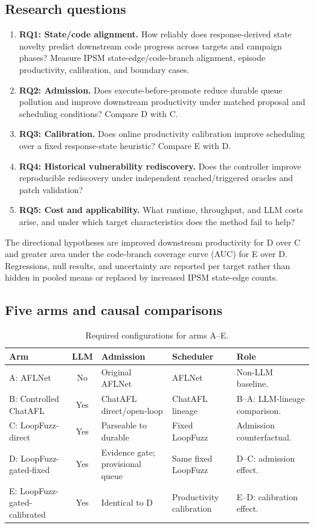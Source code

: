 \documentclass[final,5p,times,number]{elsarticle}
\begin{document}
\subsection{Research questions}
\begin{enumerate}
\item \textbf{RQ1: State/code alignment.} How reliably does response-derived state novelty predict downstream code progress across targets and campaign phases? Measure IPSM state-edge/code-branch alignment, episode productivity, calibration, and boundary cases.
\item \textbf{RQ2: Admission.} Does execute-before-promote reduce durable queue pollution and improve downstream productivity under matched proposal and scheduling conditions? Compare D with C.
\item \textbf{RQ3: Calibration.} Does online productivity calibration improve scheduling over a fixed response-state heuristic? Compare E with D.
\item \textbf{RQ4: Historical vulnerability rediscovery.} Does the controller improve reproducible rediscovery under independent reached/triggered oracles and patch validation?
\item \textbf{RQ5: Cost and applicability.} What runtime, throughput, and LLM costs arise, and under which target characteristics does the method fail to help?
\end{enumerate}
The directional hypotheses are improved downstream productivity for D over C and greater area under the code-branch coverage curve (AUC) for E over D. Regressions, null results, and uncertainty are reported per target rather than hidden in pooled means or replaced by increased IPSM state-edge counts.

\subsection{Five arms and causal comparisons}
\begin{table}[!tbp]
\centering\small
\caption{Required configurations for arms A--E.}
\label{tab:arms}
\begin{tabularx}{\textwidth}{l c Y Y Y}
\toprule
Arm & LLM & Admission & Scheduler & Role \\
\midrule
A: AFLNet & No & Original AFLNet & AFLNet & Non-LLM baseline. \\
B: Controlled ChatAFL & Yes & ChatAFL direct/open-loop & ChatAFL lineage & B--A: LLM-lineage comparison. \\
C: LoopFuzz-direct & Yes & Parseable to durable & Fixed LoopFuzz & Admission counterfactual. \\
D: LoopFuzz-gated-fixed & Yes & Evidence gate; provisional queue & Same fixed LoopFuzz & D--C: admission effect. \\
E: LoopFuzz-gated-calibrated & Yes & Identical to D & Productivity calibration & E--D: calibration effect. \\
\bottomrule
\end{tabularx}
\end{table}
\end{document}
